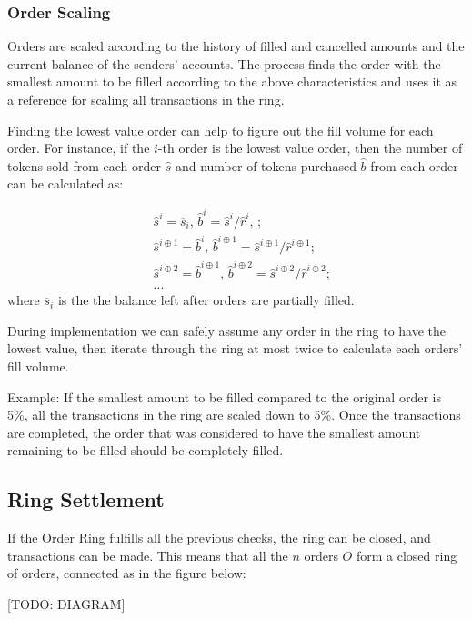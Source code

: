 \documentclass[UTF8,nofonts]{article}
\begin{document}
\subsubsection{Order Scaling}
Orders are scaled according to the history of filled and cancelled amounts and the current balance of the senders' accounts. The process finds the order with the smallest amount to be filled according to the above characteristics and uses it as a reference for scaling all transactions in the ring.


Finding the lowest value order can help to figure out the fill volume for each order. For instance, if the $i$-th order is the lowest value order, then the number of tokens sold from each order $\hat{s}$ and number of tokens purchased $\hat{b}$ from each order can be calculated as:

\[
\begin{split}
&\hat{s}^{i}=\overline{s}_i\text{, } \hat{b}^{i}=\hat{s}^{i}/ \hat{r}^i\text{, }\text{;}\\
&\hat{s}^{i\oplus 1}=\hat{b}^i\text{, } \hat{b}^{i\oplus 1}=\hat{s}^{i\oplus 1}/ \hat{r}^{i\oplus 1}\text{;}\\
&\hat{s}^{i\oplus 2}=\hat{b}^{i\oplus 1}\text{, } \hat{b}^{i\oplus 2}=\hat{s}^{i\oplus 2}/ \hat{r}^{i\oplus 2}\text{;}\\
& ...
\end{split}
\]
where $\overline{s}_i$ is the the balance left after orders are partially filled.

During implementation we can safely assume any order in the ring to have the lowest value, then iterate through the ring at most twice to calculate each orders' fill volume. 

Example: If the smallest amount to be filled compared to the original order is 5\%, all the transactions in the ring are scaled down to 5\%. Once the transactions are completed, the order that was considered to have the smallest amount remaining to be filled should be completely filled.

\subsection{Ring Settlement}

If the Order Ring fulfills all the previous checks, the ring can be closed, and transactions can be made. This means that all the $n$ orders $O$ form a closed ring of orders, connected as in the figure below:

[TODO: DIAGRAM]
\end{document}
